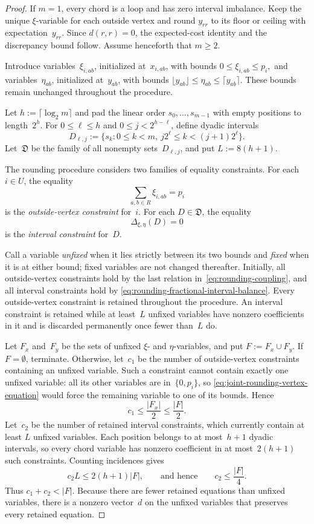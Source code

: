 \documentclass[12pt,a4paper,oneside]{report}
\begin{document}
\begin{proof}
If $m=1$, every chord is a loop and has zero interval imbalance.  Keep the
unique $\xi$-variable for each outside vertex and round
$y_{rr}$ to its floor or ceiling with expectation~$y_{rr}$.  Since
$d(r,r)=0$, the expected-cost identity and the discrepancy bound follow.
Assume henceforth that $m\ge2$.

Introduce variables~$\xi_{i,ab}$, initialized at~$x_{i,ab}$, with bounds
$
    0\le \xi_{i,ab}\le p_i,
$
and variables~$\eta_{ab}$, initialized at~$y_{ab}$, with bounds
$
    \lfloor y_{ab}\rfloor\le\eta_{ab}\le\lceil y_{ab}\rceil.
$
These bounds remain unchanged throughout the procedure.

Let $h:=\lceil\log_2m\rceil$ and pad the linear order
$s_0,\ldots,s_{m-1}$ with empty positions to length~$2^h$.  For
$0\le\ell\le h$ and $0\le j<2^{h-\ell}$, define dyadic intervals
\[
    D_{\ell,j}
    :=\{s_k:0\le k<m,\ j2^\ell\le k<(j+1)2^\ell\}.
\]
Let~$\mathfrak D$ be the family of all nonempty sets~$D_{\ell,j}$,
and put $L:=8(h+1)$.

The rounding procedure considers two families of equality constraints.  For each
$i\in U$, the equality
\begin{equation}\label{eq:joint-rounding-vertex-equation}
    \sum_{a,b\in R}\xi_{i,ab}=p_i
\end{equation}
is the \emph{outside-vertex constraint} for~$i$.  For each
$D\in\mathfrak D$, the equality
\[
    \Delta_{\xi,\eta}(D)=0
\]
is the \emph{interval constraint} for~$D$.

Call a variable \emph{unfixed} when it lies strictly between its two bounds
and \emph{fixed} when it is at either bound; fixed variables are not changed
thereafter.  Initially, all outside-vertex constraints hold by the last
relation in~\cref{eq:rounding-coupling}, and all interval constraints hold by
\cref{eq:rounding-fractional-interval-balance}.  Every outside-vertex
constraint is retained throughout the procedure.  An interval constraint is
retained while at least~$L$ unfixed variables have nonzero coefficients in it
and is discarded permanently once fewer than~$L$ do.

Let $F_x$ and~$F_y$ be the sets of unfixed $\xi$- and $\eta$-variables, and put
$F:=F_x\cup F_y$.  If $F=\emptyset$, terminate.  Otherwise, let~$c_1$ be the
number of outside-vertex constraints containing an unfixed variable.  Such a
constraint cannot contain exactly one unfixed variable:
all its other variables are in~$\{0,p_i\}$, so
\cref{eq:joint-rounding-vertex-equation} would force the remaining variable
to one of its bounds.  Hence
\[
    c_1\le\frac{|F_x|}{2}\le\frac{|F|}{2}.
\]
Let~$c_2$ be the number of retained interval constraints, which currently
contain at least $L$ unfixed variables.  Each position belongs to
at most~$h+1$ dyadic intervals, so every chord variable
has nonzero coefficient in at most~$2(h+1)$ such constraints.  Counting
incidences gives
\[
    c_2L\le2(h+1)|F|,
    \qquad\text{and hence}\qquad
    c_2\le\frac{|F|}{4}.
\]
Thus $c_1+c_2<|F|$.  Because there are fewer retained equations than unfixed
variables, there is a nonzero vector~$d$ on the unfixed variables that
preserves every retained equation.


\end{proof}
\end{document}
